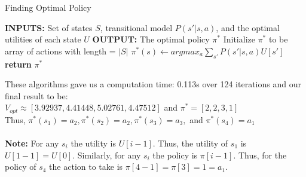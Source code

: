 \documentclass{article}
\begin{document}
\begin{itemize}
            \begin{algorithm}
            \caption{Finding Optimal Policy}
            \begin{algorithmic}
                \STATE \textbf{INPUTS:} Set of states $S$, transitional model $P(s'|s,a)$, and the
                    optimal utilities of each state $U$
                \STATE \textbf{OUTPUT:} The optimal policy $\pi^*$
                \STATE{}
                \STATE Initialize $\pi^*$ to be array of actions with length = $|S|$
                    \STATE $\pi^*(s) \leftarrow argmax_a\sum_{s'}P(s'|s, a)U[s']$
                \ENDFOR
                \STATE \textbf{return} $\pi^*$
            \end{algorithmic}
            \end{algorithm}
            These algorithms gave us a computation time: 0.113s over 124 iterations and our final result to be:\\
            $V_{opt} \approx [3.92937, 4.41448, 5.02761, 4.47512]$ and $\pi^* = [2, 2, 3, 1]$ \\
            Thus, $\pi^*(s_1)=a_2, \pi^*(s_2)=a_2, \pi^*(s_3)=a_3,$ and $\pi^*(s_4)=a_1$\\
            \\
            \textbf{Note:} For any $s_i$ the utility is $U[i - 1]$. Thus,
                the utility of $s_1$ is $U[1 - 1] = U[0]$. Similarly, for any $s_i$ the 
                policy is $\pi[i - 1]$. Thus, for the policy of $s_4$ the action to take is
                $\pi[4 - 1] = \pi[3] = 1 = a_1$.
    \end{itemize}
\end{document}
